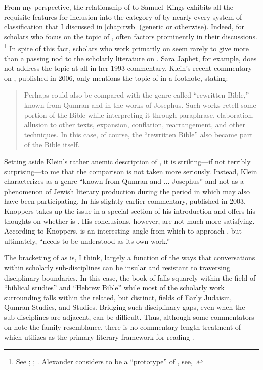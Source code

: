 From my perspective, the relationship of \chronicles to Samuel--Kings exhibits all the requisite features for inclusion into the category of \rwb by nearly every system of classification that I discussed in \autoref{chap:rwb} (generic or otherwise). Indeed, for scholars who focus on the topic of \rwb, \chronicles often factors prominently in their discussions.%
    \footnote{See
        \cite{campbell_zsengeller2014};
        \cite{zahn_lim-collins2010};
        \cite{bernstein_textus2005}.
        Alexander considers \chronicles to be a ``prototype'' of \rwb, see,
        \cite[100]{alexander_carson-williamson1988}.}
In spite of this fact, scholars who work primarily on \chronicles seem rarely to give more than a passing nod to the scholarly literature on \rwb. Sara Japhet, for example, does not address the topic at all in her 1993 commentary.%
    \autocite{japhet1993}
Klein's recent commentary on \chronicles, published in 2006, only mentions the topic of \rwb in a footnote, stating:
\begin{quote}
    Perhaps \chronicles could also be compared with the genre called ``rewritten Bible,'' known from Qumran and in the works of Josephus. Such works retell some portion of the Bible while interpreting it through paraphrase, elaboration, allusion to other texts, expansion, conflation, rearrangement, and other techniques. In this case, of course, the ``rewritten Bible'' also became part of the Bible itself.%
    \autocite[17 n.157]{klein2006}
\end{quote}
\noindent
Setting aside Klein's rather anemic description of \rwb, it is striking---if not terribly surprising---to me that the comparison is not taken more seriously. Instead, Klein characterizes \rwb as a genre ``known from Qumran and ... Josephus'' and not as a phenomenon of Jewish literary production during the \secondtemple period in which \chronicles may also have been participating. In his slightly earlier commentary, published in 2003, Knoppers takes up the issue in a special section of his introduction and offers his thoughts on whether \chronicles is \rwb.%
    \autocite[129--134]{knoppers2003}
His conclusions, however, are not much more satisfying. According to Knoppers, \rwb is an interesting angle from which to approach \chronicles, but ultimately, ``\chronicles needs to be understood as its own work.''%
    \autocite[134]{knoppers2003}

The bracketing of \chronicles as \rwb is, I think, largely a function of the ways that conversations within scholarly sub-disciplines can be insular and resistant to traversing disciplinary boundaries. In this case, the book of \chronicles falls squarely within the field of ``biblical studies'' and ``Hebrew Bible'' while most of the scholarly work surrounding \rwb falls within the related, but distinct, fields of Early Judaism, Qumran Studies, and \secondtemple Studies. Bridging such disciplinary gaps, even when the sub-disciplines are adjacent, can be difficult. Thus, although some commentators on \chronicles note the family resemblance, there is no commentary-length treatment of \chronicles which utilizes \rwb as the primary literary framework for reading \chronicles.

